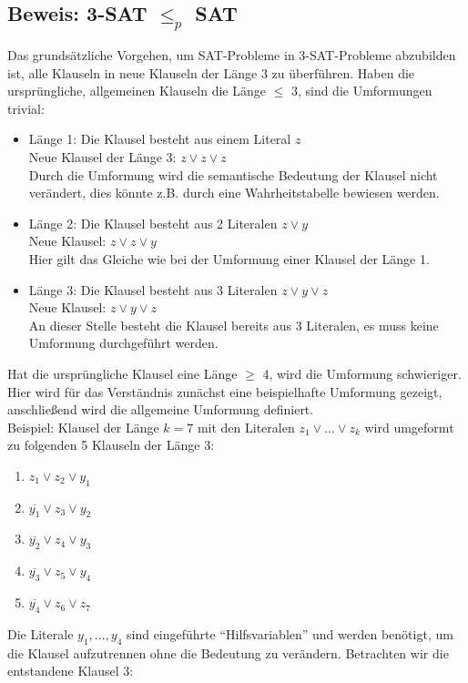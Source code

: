 \documentclass[ngerman]{article}
\begin{document}
\subsection{Beweis: 3-SAT $\le_p$ SAT}
Das grundsätzliche Vorgehen, um SAT-Probleme in 3-SAT-Probleme abzubilden ist, alle Klauseln in neue Klauseln der Länge 3 zu überführen.
Haben die ursprüngliche, allgemeinen Klauseln die Länge $\le$ 3, sind die Umformungen trivial:
\begin{itemize}
\item Länge 1: Die Klausel besteht aus einem Literal $z$\\
Neue Klausel der Länge 3: $z \vee z \vee z$\\
Durch die Umformung wird die semantische Bedeutung der Klausel nicht verändert, dies könnte z.B. durch eine Wahrheitstabelle bewiesen werden.
\item Länge 2: Die Klausel besteht aus 2 Literalen $z \vee y$\\
Neue Klausel: $z \vee z \vee y$\\
Hier gilt das Gleiche wie bei der Umformung einer Klausel der Länge 1.
\item Länge 3: Die Klausel besteht aus 3 Literalen $z \vee y \vee z$\\
Neue Klausel: $z \vee y \vee z$\\
An dieser Stelle besteht die Klausel bereits aus 3 Literalen, es muss keine Umformung durchgeführt werden.
\end{itemize}
Hat die ursprüngliche Klausel eine Länge $\ge$ 4, wird die Umformung schwieriger.
Hier wird für das Verständnis zunächst eine beispielhafte Umformung gezeigt, anschließend wird die allgemeine Umformung definiert.\\
Beispiel: Klausel der Länge $k = 7$ mit den Literalen $z_1 \vee ... \vee z_k$ wird umgeformt zu folgenden 5 Klauseln der Länge 3:
\begin{enumerate}
\item $z_1 \vee z_2 \vee y_1$
\item $\overline{y_1} \vee z_3 \vee y_2$
\item $\overline{y_2} \vee z_4 \vee y_3$
\item $\overline{y_3} \vee z_5 \vee y_4$
\item $\overline{y_4} \vee z_6 \vee z_7$
\end{enumerate}
Die Literale $y_1, ..., y_4$ sind eingeführte ``Hilfsvariablen'' und werden benötigt, um die Klausel aufzutrennen ohne die Bedeutung zu verändern.
Betrachten wir die entstandene Klausel 3:
\end{document}
